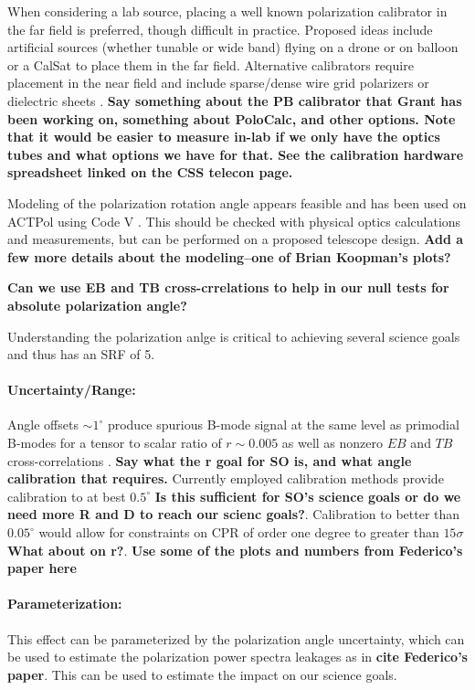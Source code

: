 When considering a lab source, placing a well known polarization
calibrator in the far field is preferred, though difficult in practice.
Proposed ideas include artificial sources \cite{nati_2017} (whether tunable or wide band) flying on a
drone or on balloon or a CalSat to place them in the far field. Alternative calibrators
require placement in the near field and include sparse/dense wire grid
polarizers or dielectric sheets \cite{Takahashi2010, 2016arXiv160701825K}. \textbf{Say something about the PB calibrator that Grant has been working on, something about PoloCalc, and other options. Note that it would be easier to measure in-lab if we only have the optics tubes and what options we have for that. See the calibration hardware spreadsheet linked on the CSS telecon page.}

Modeling of the polarization rotation angle appears feasible and has been used
on ACTPol using Code V \cite{2016arXiv160701825K}. This should be checked with
physical optics calculations and measurements, but can be performed on a proposed telescope
design. \textbf{Add a few more details about the modeling--one of Brian Koopman's plots?}

\textbf{Can we use EB and TB cross-crrelations to help in our null tests for absolute polarization angle?}

Understanding the polarization anlge is critical to achieving several science goals and thus has an SRF of 5.

\paragraph{Uncertainty/Range:}

Angle offsets $\sim 1^{\circ}$ produce spurious B-mode signal at the same level
as primodial B-modes for a tensor to scalar ratio of $r \sim 0.005$ as well as
nonzero $EB$ and $TB$ cross-correlations \cite{doi:10.1142/S0218271816400125}. \textbf{Say what the r goal for SO is, and what angle calibration that requires.}
Currently employed calibration methods provide calibration to at best
$0.5^{\circ}$ \cite{2016MNRAS.455.1981K} \textbf{Is this sufficient for SO's science goals or do we need more R and D to reach our scienc goals?}. Calibration to better than
$0.05^{\circ}$ would allow for constraints on CPR of order one degree to
greater than $15\sigma$ \cite{2016MNRAS.455.1981K} \textbf{What about on r?}.  \textbf{Use some of the plots and numbers from Federico's paper here}

\paragraph{Parameterization:}
This effect can be parameterized by the polarization angle uncertainty, which can be used to estimate the polarization power spectra leakages as in \textbf{cite Federico's paper}. This can be used to estimate the impact on our science goals.
